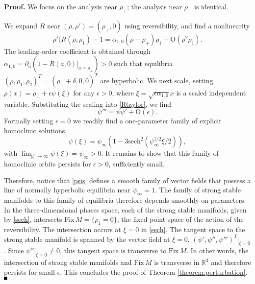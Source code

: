 \documentclass[10pt]{article}
\newenvironment{Proof}%
 {\begin{trivlist} \item[]{\bf Proof. }}%
 {\hspace*{\fill}$\rule{.4\baselineskip}{.4\baselineskip}$\end{trivlist}}
\newcommand{\R}{\mathbb{R}}
\newcommand{\rmO}{\mathrm{O}}
\begin{document}
\begin{Proof} We focus on the analysis near $\rho_+$; the analysis near $\rho_-$ is identical. 

We expand $R$ near  $(\rho,\rho') =(\rho_+, 0)$ using reversibility, and find a nonlinearity
\begin{equation}
\rho'(R(\rho, \rho_1)-1 = \alpha_{1,0} (\rho-\rho_+)\rho_1 + \rmO(\rho^2\rho_1).
\label{Rtaylor}
\end{equation}
The leading-order coefficient is obtained through  $\alpha_{1,0} = \partial_a (1-R(a,0)|_{a = \rho_+})>0$ such that equilibria  $(\rho,\rho_1,\rho_2)^T = (\rho_+ + \delta,0,0)^T$ are hyperbolic. We next scale, setting  $\rho(x)=\rho_++\epsilon \psi(\xi) $ for any $\epsilon > 0$, where $\xi = \sqrt{\epsilon\alpha_{1,0}}x$ is a scaled independent  variable. Substituting the scaling into \eqref{Rtaylor},  we find
\begin{equation}
\psi'''  = \psi\psi' +  \rmO(\epsilon).
\label{psis}\end{equation}
Formally setting $\epsilon = 0$ we readily find  a one-parameter family of explicit homoclinic solutions, 
\begin{equation}
\psi(\xi) = \psi_\infty(1- 3\text{sech}^2(\psi_\infty^{1/2} \xi/2)),
\label{sech}
\end{equation}
with $\lim_{|\xi|\to\infty} \psi(\xi) = \psi_\infty >0$. It remains to show that this family of homoclinic orbits persists for $\epsilon >0$, sufficiently small.

Therefore, notice that \eqref{psis} defines a smooth family of vector fields that possess a line of normally hyperbolic equilibria near $\psi_\infty=1$. The family of strong stable manifolds to this family of equilibria therefore depends smoothly on parameters. In the three-dimensional phases space, each of the strong stable manifolds, given by \eqref{sech}, intersects $\mathrm{Fix}\,M =\{\rho_1=0\}$, the fixed point space of the action of the reversibility. The intersection occurs at $\xi=0$ in \eqref{sech}. The tangent space to the strong stable manifold is spanned by the vector field at $\xi=0$, $(\psi',\psi'',\psi''')^T|_{\xi=0}$. Since $\psi''|_{\xi=0}\neq 0$, this tangent space is transverse to $\mathrm{Fix}\,M $. In other words, the intersection of strong stable manifolds and $\mathrm{Fix}\,M $ is transverse in $\R^3$ and therefore persists for small $\epsilon$.  This concludes the proof of Theorem \ref{theorem:perturbation}.
\end{Proof}
\end{document}

